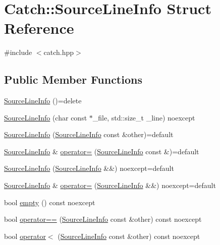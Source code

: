 \hypertarget{struct_catch_1_1_source_line_info}{}\section{Catch\+:\+:Source\+Line\+Info Struct Reference}
\label{struct_catch_1_1_source_line_info}


{\ttfamily \#include $<$catch.\+hpp$>$}

\subsection*{Public Member Functions}
\begin{DoxyCompactItemize}
\item 
\mbox{\hyperlink{struct_catch_1_1_source_line_info_a2d80932bb4129b1606d1924a5c44be2f}{Source\+Line\+Info}} ()=delete
\item 
\mbox{\hyperlink{struct_catch_1_1_source_line_info_a48510b82a39a042ab370ed143dd30c10}{Source\+Line\+Info}} (char const $\ast$\+\_\+file, std\+::size\+\_\+t \+\_\+line) noexcept
\item 
\mbox{\hyperlink{struct_catch_1_1_source_line_info_a7c44c9986c33a9cf842b791374332d41}{Source\+Line\+Info}} (\mbox{\hyperlink{struct_catch_1_1_source_line_info}{Source\+Line\+Info}} const \&other)=default
\item 
\mbox{\hyperlink{struct_catch_1_1_source_line_info}{Source\+Line\+Info}} \& \mbox{\hyperlink{struct_catch_1_1_source_line_info_a1a6cfc0197357ef4e329bb256aa8a354}{operator=}} (\mbox{\hyperlink{struct_catch_1_1_source_line_info}{Source\+Line\+Info}} const \&)=default
\item 
\mbox{\hyperlink{struct_catch_1_1_source_line_info_a5ea6179645457b8ec961aec9ca4c5588}{Source\+Line\+Info}} (\mbox{\hyperlink{struct_catch_1_1_source_line_info}{Source\+Line\+Info}} \&\&) noexcept=default
\item 
\mbox{\hyperlink{struct_catch_1_1_source_line_info}{Source\+Line\+Info}} \& \mbox{\hyperlink{struct_catch_1_1_source_line_info_ab8469b89d86bdd69b6b9f2b610600258}{operator=}} (\mbox{\hyperlink{struct_catch_1_1_source_line_info}{Source\+Line\+Info}} \&\&) noexcept=default
\item 
bool \mbox{\hyperlink{struct_catch_1_1_source_line_info_a10a5b5b7dff82971879c2eb8d83f9b3b}{empty}} () const noexcept
\item 
bool \mbox{\hyperlink{struct_catch_1_1_source_line_info_af07e4fdeddf8409b91e4f842f6264cf8}{operator==}} (\mbox{\hyperlink{struct_catch_1_1_source_line_info}{Source\+Line\+Info}} const \&other) const noexcept
\item 
bool \mbox{\hyperlink{struct_catch_1_1_source_line_info_af77415416919d2d6030b4be085b92f7a}{operator$<$}} (\mbox{\hyperlink{struct_catch_1_1_source_line_info}{Source\+Line\+Info}} const \&other) const noexcept
\end{DoxyCompactItemize}
